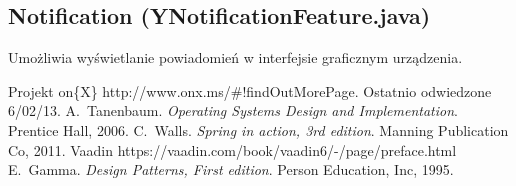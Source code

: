 \documentclass[11pt,a4paper,polish,thesis]{dcsbook}
\begin{document}
\subsection{Notification (YNotificationFeature.java)}
Umożliwia wyświetlanie powiadomień w interfejsie graficznym urządzenia.

\backmatter

\begin{thebibliography}{1}
Projekt on\{X\} http://www.onx.ms/\#!findOutMorePage. Ostatnio odwiedzone 6/02/13.
A.~Tanenbaum. \emph{Operating Systems Design and Implementation}. Prentice Hall, 2006.
C.~Walls. \emph{Spring in action, 3rd edition}. Manning Publication Co, 2011.
Vaadin https://vaadin.com/book/vaadin6/-/page/preface.html 
E.~Gamma. \emph{Design Patterns, First edition}. Person Education, Inc, 1995.
\end{thebibliography}
\end{document}
